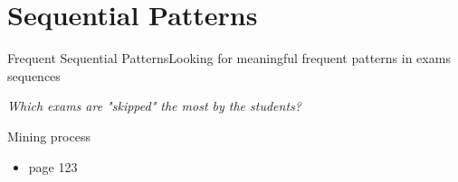 \section{Sequential Patterns}

\begin{frame}{Frequent Sequential Patterns}{Looking for meaningful frequent patterns in exams sequences}

     \centering\textit{Which exams are "skipped" the most by the students?} \vspace{0,3cm}
    
\begin{block}{Mining process}
		\begin{itemize}
			\item<1-> page 123
		\end{itemize}
	\end{block}

\end{frame}